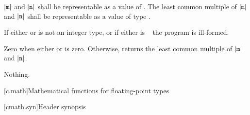 \begin{itemdescr}
\pnum
\requires
$|\texttt{m}|$ and $|\texttt{n}|$ shall
be representable as a value of .
The least common multiple of $|\texttt{m}|$ and $|\texttt{n}|$
shall be representable as a value of type .

\pnum
\remarks
If either  or  is not an integer type, or
if either is \cv{}~ the program is ill-formed.

\pnum
\returns
Zero when either  or  is zero.
Otherwise, returns the least common multiple of $|\texttt{m}|$ and $|\texttt{n}|$.

\pnum
\throws
Nothing.
\end{itemdescr}


[c.math]{Mathematical functions for floating-point types}

[cmath.syn]{Header  synopsis}

